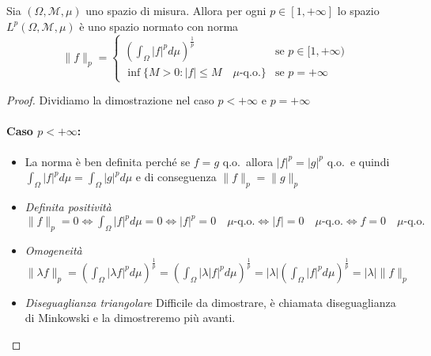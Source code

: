 \begin{proposition}\label{prp:spazio-Lp-normato}
    Sia \((\Omega, \mathcal{M}, \mu)\) uno spazio di misura. Allora per ogni
    \(p \in [1, +\infty]\) lo spazio \(L^{p}(\Omega, \mathcal{M}, \mu)\) è uno
    spazio normato con norma
    \[
        \|f\|_p = 
        \begin{cases}
            \displaystyle
            {\left( \int_{\Omega} |f|^{p} d\mu
            \right)}^{\frac{1}{p}} & \text{se } p \in [1, +\infty) \\
            \inf \{M > 0 : |f| \le M \quad \mu\text{-q.o.} \} & \text{se } p = +\infty
        \end{cases}
    \]
\end{proposition}
\begin{proof}
    Dividiamo la dimostrazione nel caso \(p < +\infty\) e \(p = +\infty\) 

    \paragraph{Caso \(p < +\infty\):}
\begin{itemize}[label = --]
    \item La norma è ben definita perché se \(f = g\) q.o.~allora \(|f|^{p} =
        |g|^{p}\) q.o.~e quindi \(\int_{\Omega} |f|^{p} d\mu = \int_{\Omega}
        |g|^{p} d\mu\) e di conseguenza \(\|f\|_p = \|g\|_p\) 
    \item \emph{Definita positività} \(\|f\|_p = 0 \iff \int_{\Omega} |f|^{p}
        d\mu = 0 \iff |f|^{p} = 0 \quad \mu\text{-q.o.} \iff |f| = 0 \quad
        \mu\text{-q.o.} \iff f = 0 \quad \mu\text{-q.o.}\)
    \item \emph{Omogeneità} \(\|\lambda f\|_p = {\left( \int_{\Omega} |\lambda
        f|^{p} d\mu \right)}^{\frac{1}{p}} = {\left( \int_{\Omega} |\lambda
        |f|^{p} d\mu \right)}^{\frac{1}{p}} = |\lambda| {\left( \int_{\Omega}
        |f|^{p} d\mu \right)}^{\frac{1}{p}} = |\lambda| \|f\|_p\)
    \item \emph{Diseguaglianza triangolare} Difficile da dimostrare, è chiamata
        diseguaglianza di Minkowski e la dimostreremo più avanti.
\end{itemize}

\end{proof}
